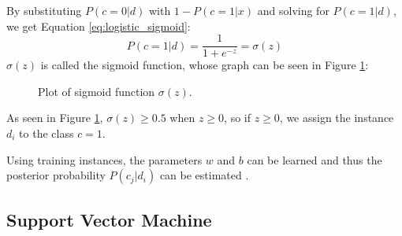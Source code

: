 By substituting $P(c=0|d)$ with $1 - P(c=1|x)$ and solving for $P(c=1|d)$, we get Equation \eqref{eq:logistic_sigmoid}:
        {\begin{equation}
            \label{eq:logistic_sigmoid}
                P(c=1|d) = \frac{1}{1+e^{-z}} = \sigma(z)
        \end{equation}}
$\sigma(z)$ is called the sigmoid function, whose graph can be seen in Figure \ref{fig:sigmoid}:
        \begin{figure}[h!]
        \centering

    \caption{Plot of sigmoid function $\sigma(z)$.}
      \label{fig:sigmoid}
\end{figure}

As seen in Figure \ref{fig:sigmoid}, $\sigma(z) \geq 0.5$ when $z \geq 0$, so if $z \geq 0$, we assign the instance $d_i$ to the class $c = 1$.

Using training instances, the parameters $w$ and $b$ can be learned and thus the posterior probability $P(c_j|d_i)$ can be estimated \cite{DBLP:books/aw/TanSKK2019}.

\subsection{Support Vector Machine}



    

        
    
        
        
